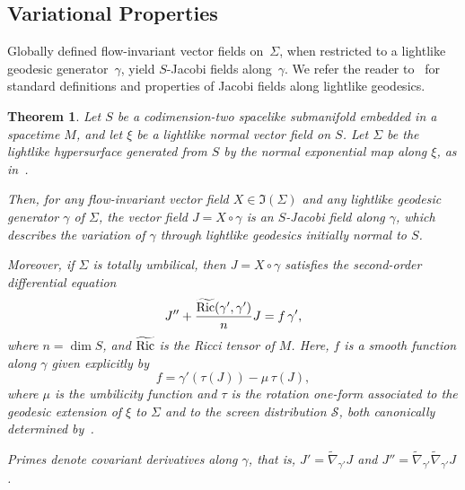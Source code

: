 \documentclass[11pt]{article}
\numberwithin{equation}{section}
\newtheorem{theorem}{Theorem}[section]
\begin{document}
	
	\subsection{Variational Properties}
	
	Globally defined flow-invariant vector fields on~$\Sigma$, when restricted to a lightlike geodesic generator~$\gamma$, yield $S$-Jacobi fields along~$\gamma$. We refer the reader to~\cite{beem, oneill} for standard definitions and properties of Jacobi fields along lightlike geodesics.
	
	\begin{theorem}\label{corSJacobi}
		Let $S$ be a codimension-two spacelike submanifold embedded in a spacetime $M$, and let $\xi$ be a lightlike normal vector field on $S$. Let $\Sigma$ be the lightlike hypersurface generated from $S$ by the normal exponential map along $\xi$, as in~. 
		
		Then, for any flow-invariant vector field $X \in \mathfrak{I}(\Sigma)$ and any lightlike geodesic generator $\gamma$ of $\Sigma$, the vector field $J = X \circ \gamma$ is an $S$-Jacobi field along $\gamma$, which describes the variation of $\gamma$ through lightlike geodesics initially normal to $S$.
		
		Moreover, if $\Sigma$ is totally umbilical, then $J= X \circ \gamma$ satisfies the second-order differential equation
		\begin{equation}\label{JRicc}
			J'' + \frac{\widetilde{{\rm Ric}}(\gamma', \gamma')}{n} J = f\, \gamma',
		\end{equation}
		where $n = \dim S$, and $\widetilde{{\rm Ric}}$ is the Ricci tensor of $M$. Here, $f$ is a smooth function along $\gamma$ given explicitly by
		\begin{equation}\label{eq:f_expresion_Variational_Prp}
			f = \gamma'(\tau(J)) - \mu\, \tau(J),
		\end{equation}
		where $\mu$ is the umbilicity function and $\tau$ is the rotation one-form associated to the geodesic extension of $\xi$ to $\Sigma$ and to the screen distribution $\mathcal{S}$, both canonically determined by~.
		
		Primes denote covariant derivatives along $\gamma$, that is, $J' = \widetilde{\nabla}_{\gamma'} J$ and $J'' = \widetilde{\nabla}_{\gamma'} \widetilde{\nabla}_{\gamma'} J$.
	\end{theorem}
\end{document}
